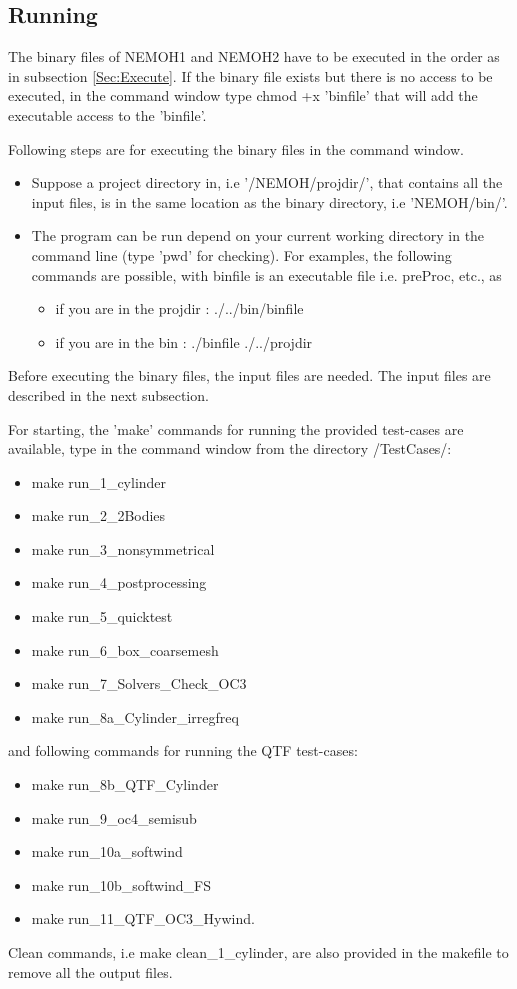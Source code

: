 \documentclass[12pt,a4paper,titlepage]{article}
\begin{document}
\subsection{Running}
The binary files of NEMOH1 and NEMOH2 have to be executed in the order as in subsection \ref{Sec:Execute}. If the binary file exists but there is no access to be executed, in the command window type chmod +x 'binfile' that will add the executable access to the 'binfile'.

Following steps are for executing the binary files in the command window.
\begin{itemize}
\item Suppose a project directory in, i.e '/NEMOH/projdir/', that contains all the input files, is in the same location as the binary directory, i.e 'NEMOH/bin/'.
\item The program can be run depend on your current working directory in the command line (type 'pwd' for checking). For examples, the following commands are possible, with binfile is an executable file i.e. preProc, etc., as
\begin{itemize}
\item if you are in the projdir : ./../bin/binfile
\item if you are in the bin	: ./binfile ./../projdir
\end{itemize}
\end{itemize}

Before executing the binary files, the input files are needed. The input files are described in the next subsection.

For starting, the 'make' commands for running the provided test-cases are available, type in the command window from the directory /TestCases/:
\begin{itemize}
\item make run\_1\_cylinder
\item make run\_2\_2Bodies
\item make run\_3\_nonsymmetrical
\item make run\_4\_postprocessing
\item make run\_5\_quicktest
\item make run\_6\_box\_coarsemesh
\item make run\_7\_Solvers\_Check\_OC3
\item make run\_8a\_Cylinder\_irregfreq
\end{itemize}
and following commands for running the QTF test-cases:
\begin{itemize}
\item make run\_8b\_QTF\_Cylinder
\item make run\_9\_oc4\_semisub
\item make run\_10a\_softwind
\item make run\_10b\_softwind\_FS
\item make run\_11\_QTF\_OC3\_Hywind.
\end{itemize}
Clean commands, i.e make clean\_1\_cylinder, are also provided in the makefile to remove all the output files.
\end{document}
